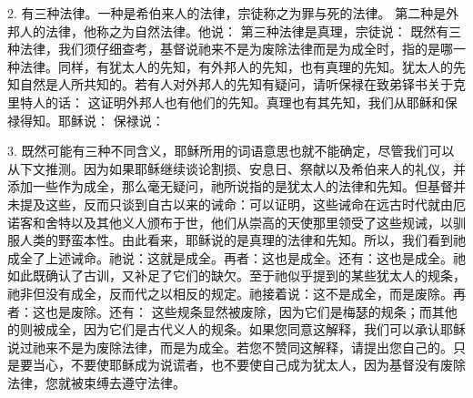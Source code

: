 2. 有三种法律。一种是希伯来人的法律，宗徒称之为罪与死的法律。 第二种是外邦人的法律，他称之为自然法律。他说： 第三种法律是真理，宗徒说： 既然有三种法律，我们须仔细查考，基督说祂来不是为废除法律而是为成全时，指的是哪一种法律。同样，有犹太人的先知，有外邦人的先知，也有真理的先知。犹太人的先知自然是人所共知的。若有人对外邦人的先知有疑问，请听保禄在致弟铎书关于克里特人的话： 这证明外邦人也有他们的先知。真理也有其先知，我们从耶稣和保禄得知。耶稣说： 保禄说：\par

3. 既然可能有三种不同含义，耶稣所用的词语意思也就不能确定，尽管我们可以从下文推测。因为如果耶稣继续谈论割损、安息日、祭献以及希伯来人的礼仪，并添加一些作为成全，那么毫无疑问，祂所说指的是犹太人的法律和先知。但基督并未提及这些，反而只谈到自古以来的诫命：可以证明，这些诫命在远古时代就由厄诺客和舍特以及其他义人颁布于世，他们从崇高的天使那里领受了这些规诫，以驯服人类的野蛮本性。由此看来，耶稣说的是真理的法律和先知。所以，我们看到祂成全了上述诫命。祂说：这就是成全。再者：这也是成全。还有：这也是成全。祂如此既确认了古训，又补足了它们的缺欠。至于祂似乎提到的某些犹太人的规条，祂非但没有成全，反而代之以相反的规定。祂接着说：这不是成全，而是废除。再者：这也是废除。还有： 这些规条显然被废除，因为它们是梅瑟的规条；而其他的则被成全，因为它们是古代义人的规条。如果您同意这解释，我们可以承认耶稣说过祂来不是为废除法律，而是为成全。若您不赞同这解释，请提出您自己的。只是要当心，不要使耶稣成为说谎者，也不要使自己成为犹太人，因为基督没有废除法律，您就被束缚去遵守法律。\par

